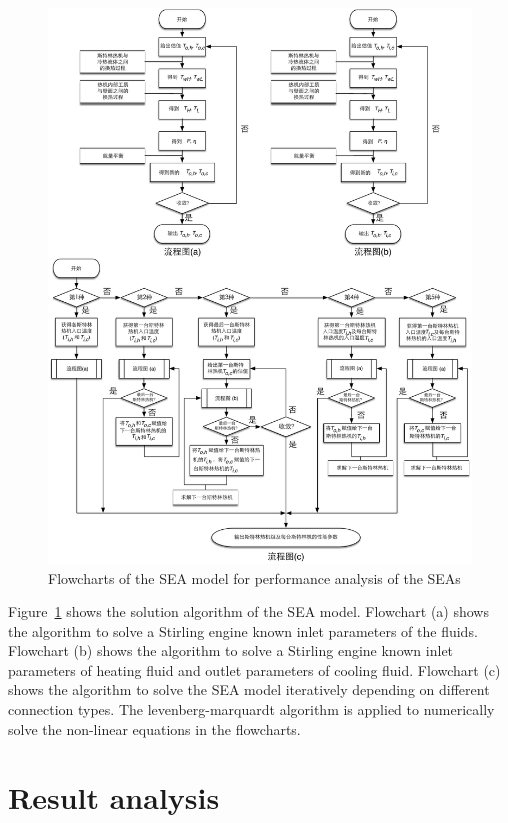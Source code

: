 \noindent \begin{figure}[htbp]
\begin{center}
	\includegraphics[width = 1.0\columnwidth]{fig/FlowChart}
	\caption{Flowcharts of the SEA model for performance analysis of the SEAs}
	\label{fig:Flowchart}
\end{center}
\end{figure}

Figure~\ref{fig:Flowchart} shows the solution algorithm of the SEA model. Flowchart (a) shows the algorithm to solve a Stirling engine known inlet parameters of the fluids. Flowchart (b) shows the algorithm to solve a Stirling engine known inlet parameters of heating fluid and outlet parameters of cooling fluid. Flowchart (c) shows the algorithm to solve the SEA model iteratively depending on different connection types. The levenberg-marquardt algorithm is applied to numerically solve the non-linear equations in the flowcharts.

\section{Result analysis}

